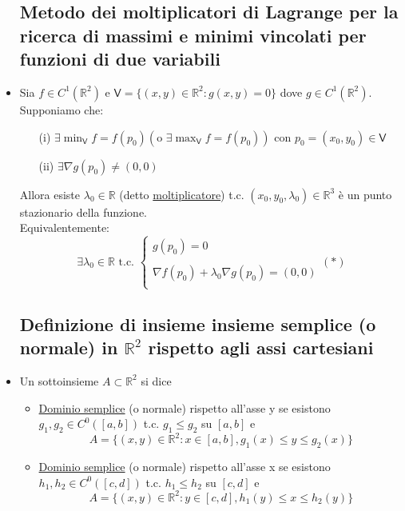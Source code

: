 \documentclass{report}
\newcommand{\ace}{\`e }
\newcommand{\Ins}[1]{\mathbb{#1}}
\newcommand{\R}{\Ins{R}}
\newcommand{\V}{\mathsf{V}}
\begin{document}
\begin{itemize}
  \subsection{Metodo dei moltiplicatori di Lagrange per la ricerca di massimi e minimi vincolati per funzioni di due variabili}
  \item Sia $f \in C^1(\R^2)$ e $\V = \{(x,y)\in \R^2 : g(x,y) = 0\}$ dove $g \in C^1(\R^2)$. Supponiamo che:
        \begin{enumerate}
          \item[(i)] $\exists \min_{\V} f = f(p_0) (\text{o } \exists \max_{\V} f = f(p_0))$ con $p_0 = (x_0,y_0) \in \V$
          \item[(ii)] $\exists \nabla g(p_0) \not = (0,0)$
        \end{enumerate}
        Allora esiste $\lambda_0 \in \R$ (detto \underline{moltiplicatore}) t.c. $(x_0,y_0,\lambda_0)\in \R^3$ \ace un 
        punto stazionario della funzione. \\
        Equivalentemente: $$\exists\lambda_0 \in \R \text{ t.c. } \left\{\begin{array}{l}
          g(p_0) = 0 \\
          \\
          \nabla f(p_0) + \lambda_0 \nabla g(p_0) = (0,0) \\
        \end{array}\right. (*)  \label{tml_v2}$$
  
  \subsection{Definizione di insieme insieme semplice (o normale) in $\R^2$ rispetto agli assi cartesiani}
  \item Un sottoinsieme $A \subset \R^2$ si dice 
          \begin{itemize}
            \item \underline{Dominio semplice} (o normale) rispetto all'asse y se esistono 
                  $g_1, g_2 \in C^0([a,b])$ t.c. $g_1 \leq g_2$ su $[a,b]$ e 
                  $$A = \{(x,y)\in\R^2 : x \in [a,b], g_1(x) \leq y \leq g_2(x)\}$$
            \item \underline{Dominio semplice} (o normale) rispetto all'asse x se esistono 
                  $h_1, h_2 \in C^0([c,d])$ t.c. $h_1 \leq h_2$ su $[c,d]$ e 
                  $$A = \{(x,y)\in\R^2 : y \in [c,d], h_1(y) \leq x \leq h_2(y)\}$$
          \end{itemize}


\end{itemize}
\end{document}
